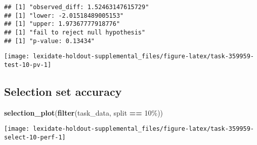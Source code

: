 \documentclass[
]{book}
\newenvironment{Shaded}{\begin{snugshade}}{\end{snugshade}}
\newcommand{\AttributeTok}[1]{\textcolor[rgb]{0.13,0.29,0.53}{#1}}
\newcommand{\DecValTok}[1]{\textcolor[rgb]{0.00,0.00,0.81}{#1}}
\newcommand{\FunctionTok}[1]{\textcolor[rgb]{0.13,0.29,0.53}{\textbf{#1}}}
\newcommand{\NormalTok}[1]{#1}
\newcommand{\OtherTok}[1]{\textcolor[rgb]{0.56,0.35,0.01}{#1}}
\newcommand{\SpecialCharTok}[1]{\textcolor[rgb]{0.81,0.36,0.00}{\textbf{#1}}}
\newcommand{\StringTok}[1]{\textcolor[rgb]{0.31,0.60,0.02}{#1}}
\begin{document}
\begin{Shaded}
\end{Shaded}

\begin{verbatim}
## [1] "observed_diff: 1.52463147615729"
## [1] "lower: -2.01518489005153"
## [1] "upper: 1.97367777918776"
## [1] "fail to reject null hypothesis"
## [1] "p-value: 0.13434"
\end{verbatim}

\texttt{[image: lexidate-holdout-supplemental\_files/figure-latex/task-359959-test-10-pv-1]}

\hypertarget{selection-set-accuracy-36}{%
\subsection{Selection set accuracy}\label{selection-set-accuracy-36}}

\begin{Shaded}
\begin{Highlighting}[]
\FunctionTok{selection\_plot}\NormalTok{(}\FunctionTok{filter}\NormalTok{(task\_data, split }\SpecialCharTok{==} \StringTok{\textquotesingle{}10\%\textquotesingle{}}\NormalTok{))}
\end{Highlighting}
\end{Shaded}

\texttt{[image: lexidate-holdout-supplemental\_files/figure-latex/task-359959-select-10-perf-1]}
\end{document}
